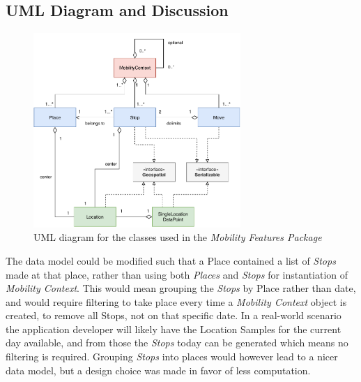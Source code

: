 \subsection{UML Diagram and Discussion}

\begin{figure}[h]
    \centering
    \includegraphics[width=0.7\textwidth]{images/diagrams/uml.pdf}
    \caption{UML diagram for the classes used in the \textit{Mobility Features Package}}
    \label{fig:my_label}
\end{figure}

The data model could be modified such that a Place contained a list of \textit{Stops} made at that place, rather than using both \textit{Places} and \textit{Stops} for instantiation of \textit{Mobility Context}. This would mean grouping the \textit{Stops} by Place rather than date, and would require filtering to take place every time a \textit{Mobility Context} object is created, to remove all Stops, not on that specific date. In a real-world scenario the application developer will likely have the Location Samples for the current day available, and from those the \textit{Stops} today can be generated which means no filtering is required. Grouping \textit{Stops} into places would however lead to a nicer data model, but a design choice was made in favor of less computation. 


